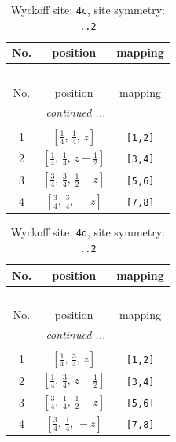 \documentclass[fleqn,8pt]{jsarticle}
\begin{document}
\renewcommand{\arraystretch}{1.2}
\begin{longtable}{ccc}
\caption{Wyckoff site: {\tt 4c}, site symmetry: {\tt ..2}}
 \\
 \hline \hline
No. & position & mapping \\ \hline \endfirsthead

\multicolumn{2}{l}{\tablename\ \thetable{}} \\
 \hline \hline
No. & position & mapping \\ \hline \endhead

 \hline \hline
\multicolumn{2}{r}{\footnotesize\it continued ...} \\ \endfoot

 \hline \hline
\multicolumn{2}{r}{} \\ \endlastfoot

1 & $\left[ \frac{1}{4},\, \frac{1}{4},\, z \right]$ & {\tt [1,2]} \\ \hline
2 & $\left[ \frac{1}{4},\, \frac{1}{4},\, z + \frac{1}{2} \right]$ & {\tt [3,4]} \\ \hline
3 & $\left[ \frac{3}{4},\, \frac{3}{4},\, \frac{1}{2} - z \right]$ & {\tt [5,6]} \\ \hline
4 & $\left[ \frac{3}{4},\, \frac{3}{4},\, - z \right]$ & {\tt [7,8]} \\
\end{longtable}
\renewcommand{\arraystretch}{1.2}
\begin{longtable}{ccc}
\caption{Wyckoff site: {\tt 4d}, site symmetry: {\tt ..2}}
 \\
 \hline \hline
No. & position & mapping \\ \hline \endfirsthead

\multicolumn{2}{l}{\tablename\ \thetable{}} \\
 \hline \hline
No. & position & mapping \\ \hline \endhead

 \hline \hline
\multicolumn{2}{r}{\footnotesize\it continued ...} \\ \endfoot

 \hline \hline
\multicolumn{2}{r}{} \\ \endlastfoot

1 & $\left[ \frac{1}{4},\, \frac{3}{4},\, z \right]$ & {\tt [1,2]} \\ \hline
2 & $\left[ \frac{1}{4},\, \frac{3}{4},\, z + \frac{1}{2} \right]$ & {\tt [3,4]} \\ \hline
3 & $\left[ \frac{3}{4},\, \frac{1}{4},\, \frac{1}{2} - z \right]$ & {\tt [5,6]} \\ \hline
4 & $\left[ \frac{3}{4},\, \frac{1}{4},\, - z \right]$ & {\tt [7,8]} \\
\end{longtable}
\end{document}
